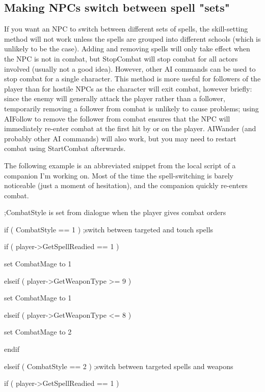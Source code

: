 

\hypertarget{making-npcs-switch-between-spell-sets}{%
\subsection{Making NPCs switch between spell
"sets"}\label{making-npcs-switch-between-spell-sets}}

If you want an NPC to switch between different sets of spells, the
skill-setting method will not work unless the spells are grouped into
different schools (which is unlikely to be the case). Adding and
removing spells will only take effect when the NPC is not in combat, but
StopCombat will stop combat for all actors involved (usually not a good
idea). However, other AI commands can be used to stop combat for a
single character. This method is more useful for followers of the player
than for hostile NPCs as the character will exit combat, however
briefly: since the enemy will generally attack the player rather than a
follower, temporarily removing a follower from combat is unlikely to
cause problems; using AIFollow to remove the follower from combat
ensures that the NPC will immediately re-enter combat at the first hit
by or on the player. AIWander (and probably other AI commands) will also
work, but you may need to restart combat using StartCombat afterwards.

The following example is an abbreviated snippet from the local script of
a companion I'm working on. Most of the time the spell-switching is
barely noticeable (just a moment of hesitation), and the companion
quickly re-enters combat.

;CombatStyle is set from dialogue when the player gives combat orders

if ( CombatStyle == 1 ) ;switch between targeted and touch spells

if ( player-\textgreater GetSpellReadied == 1 )

set CombatMage to 1

elseif ( player-\textgreater GetWeaponType \textgreater= 9 )

set CombatMage to 1

elseif ( player-\textgreater GetWeaponType \textless= 8 )

set CombatMage to 2

endif

elseif ( CombatStyle == 2 ) ;switch between targeted spells and weapons

if ( player-\textgreater GetSpellReadied == 1 )

